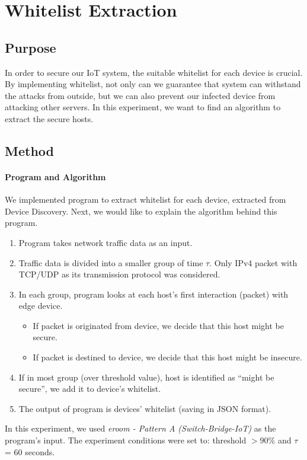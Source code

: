 
\section{Whitelist Extraction}
\subsection{Purpose}
In order to secure our IoT system, the suitable whitelist for each device is crucial. By implementing whitelist, not only can we guarantee that system can withstand the attacks from outside, but we can also prevent our infected device from attacking other servers. In this experiment, we want to find an algorithm to extract the secure hosts. 

\subsection{Method}
\paragraph{Program and Algorithm}
We implemented program to extract whitelist for each device, extracted from Device Discovery. Next, we would like to explain the algorithm behind this program.

\begin{enumerate} 
    \item Program takes network traffic data as an input.
    \item Traffic data is divided into a smaller group of time $\tau$. Only IPv4 packet with TCP/UDP as its transmission protocol was considered. 
    \item In each group, program looks at each host’s first interaction (packet) with edge device.
    \begin{itemize}
        \item If packet is originated from device, we decide that this host might be secure. 
        \item If packet is destined to device, we decide that this host might be insecure.
    \end{itemize}
    \item If in most group (over threshold value), host is identified as “might be secure”, we add it to device’s whitelist. 
    \item The output of program is devices’ whitelist (saving in JSON format).
\end{enumerate}

In this experiment, we used \textit{eroom - Pattern A (Switch-Bridge-IoT)} as the program's input.
The experiment conditions were set to: threshold $>90\%$ and $\tau$ = 60 seconds.


